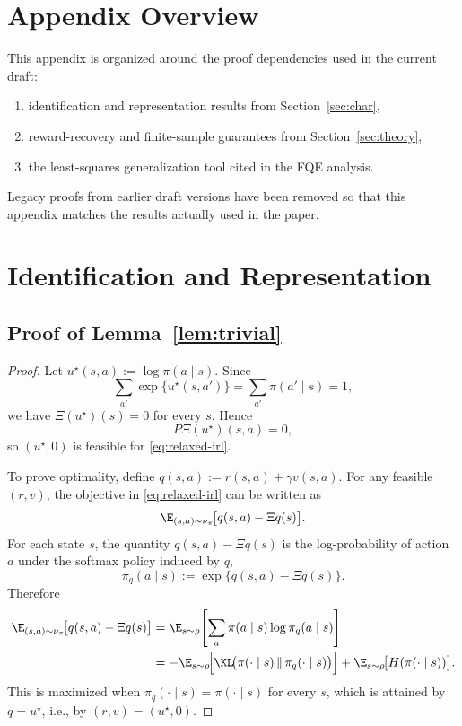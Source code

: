 \appendix
\onecolumn

\section{Appendix Overview}
\label{app:overview}

This appendix is organized around the proof dependencies used in the current
draft:
\begin{enumerate}
    \item identification and representation results from
    Section~\ref{sec:char},
    \item reward-recovery and finite-sample guarantees from
    Section~\ref{sec:theory},
    \item the least-squares generalization tool cited in the FQE analysis.
\end{enumerate}
Legacy proofs from earlier draft versions have been removed so that this
appendix matches the results actually used in the paper.

\section{Identification and Representation}
\label{app:identification}

\subsection{Proof of Lemma~\ref{lem:trivial}}

\begin{proof}
Let \(u^\star(s,a):=\log \pi(a\mid s)\). Since
\[
\sum_{a'}\exp\{u^\star(s,a')\}
=
\sum_{a'} \pi(a'\mid s)
=
1,
\]
we have \(\Xi(u^\star)(s)=0\) for every \(s\). Hence
\[
P\Xi(u^\star)(s,a)=0,
\]
so \((u^\star,0)\) is feasible for \eqref{eq:relaxed-irl}.

To prove optimality, define \(q(s,a):=r(s,a)+\gamma v(s,a)\). For any feasible
\((r,v)\), the objective in \eqref{eq:relaxed-irl} can be written as
\[
\E_{(s,a)\sim \nu_\pi}\!\big[q(s,a)-\Xi q(s)\big].
\]
For each state \(s\), the quantity \(q(s,a)-\Xi q(s)\) is the log-probability
of action \(a\) under the softmax policy induced by \(q\),
\[
\pi_q(a\mid s)
:=
\exp\{q(s,a)-\Xi q(s)\}.
\]
Therefore
\begin{align*}
\E_{(s,a)\sim \nu_\pi}\!\big[q(s,a)-\Xi q(s)\big]
&=
\E_{s\sim \rho}\!\left[
\sum_a \pi(a\mid s)\log \pi_q(a\mid s)
\right] \\
&=
-\E_{s\sim \rho}\!\Bigl[
\KL\!\bigl(\pi(\cdot\mid s)\,\|\,\pi_q(\cdot\mid s)\bigr)
\Bigr]
+ \E_{s\sim \rho}\!\bigl[H(\pi(\cdot\mid s))\bigr].
\end{align*}
This is maximized when \(\pi_q(\cdot\mid s)=\pi(\cdot\mid s)\) for every
\(s\), which is attained by \(q=u^\star\), i.e., by \((r,v)=(u^\star,0)\).
\end{proof}

